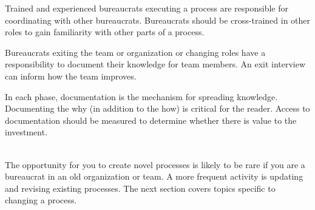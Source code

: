 Trained and experienced bureaucrats executing a process are responsible for coordinating with other bureaucrats. Bureaucrats should be cross-trained in other roles to gain familiarity with other parts of a process. 

Bureaucrats exiting the team or organization or changing roles have a responsibility to document their knowledge for team members. An exit interview can inform how the team improves. 

In each phase, documentation is the mechanism for spreading knowledge. Documenting the why (in addition to the how) is critical for the reader. Access to documentation should be measured to determine whether there is value to the investment. 


\noindent\hrulefill

\ \\

The opportunity for you to create novel processes is likely to be rare if you are a bureaucrat in an old organization or team. A more frequent activity is updating and revising existing processes. The next section covers topics specific to changing a process.
